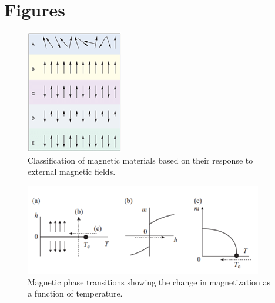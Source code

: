\documentclass[conference, compsoc, twoside]{IEEEtran}
\begin{document}
\IEEEpeerreviewmaketitle
\thispagestyle{firststyle}






\balance




\section*{Figures}

\begin{figure}[ht]
    \centering
    \includegraphics[width=0.9\columnwidth]{Gambar 1. Klasifikasi Magnetik.png}
    \caption{Classification of magnetic materials based on their response to external magnetic fields.}
    \label{fig:magnetic_classification}
\end{figure}

\begin{figure}[ht]
    \centering
    \includegraphics[width=0.9\columnwidth]{Gambar 4. Perubahan Fase Magnetik.png}
    \caption{Magnetic phase transitions showing the change in magnetization as a function of temperature.}
    \label{fig:magnetic_phase_transition}
\end{figure}
\end{document}
